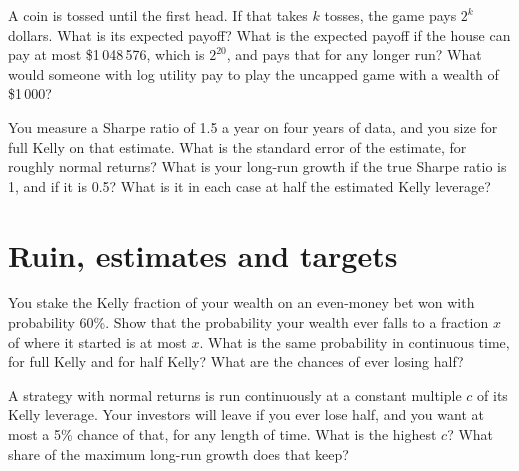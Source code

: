 \begin{question}\label{iq:iv2:betting-and-kelly:24}
A coin is tossed until the first head. If that takes $k$ tosses, the game pays $2^k$ dollars. What is its expected payoff? What is the expected payoff if the house can pay at most \$1\,048\,576, which is $2^{20}$, and pays that for any longer run? What would someone with log utility pay to play the uncapped game with a wealth of \$1\,000?
\end{question}

\begin{question}\label{iq:iv2:betting-and-kelly:25}
You measure a Sharpe ratio of 1.5 a year on four years of data, and you size for full Kelly on that estimate. What is the standard error of the estimate, for roughly normal returns? What is your long-run growth if the true Sharpe ratio is 1, and if it is 0.5? What is it in each case at half the estimated Kelly leverage?
\end{question}

\section{Ruin, estimates and targets}

\begin{question}\label{iq:iv2:betting-and-kelly:26}
You stake the Kelly fraction of your wealth on an even-money bet won with probability 60\%. Show that the probability your wealth ever falls to a fraction $x$ of where it started is at most $x$. What is the same probability in continuous time, for full Kelly and for half Kelly? What are the chances of ever losing half?
\end{question}

\begin{question}\label{iq:iv2:betting-and-kelly:27}
A strategy with normal returns is run continuously at a constant multiple $c$ of its Kelly leverage. Your investors will leave if you ever lose half, and you want at most a 5\% chance of that, for any length of time. What is the highest $c$? What share of the maximum long-run growth does that keep?
\end{question}

